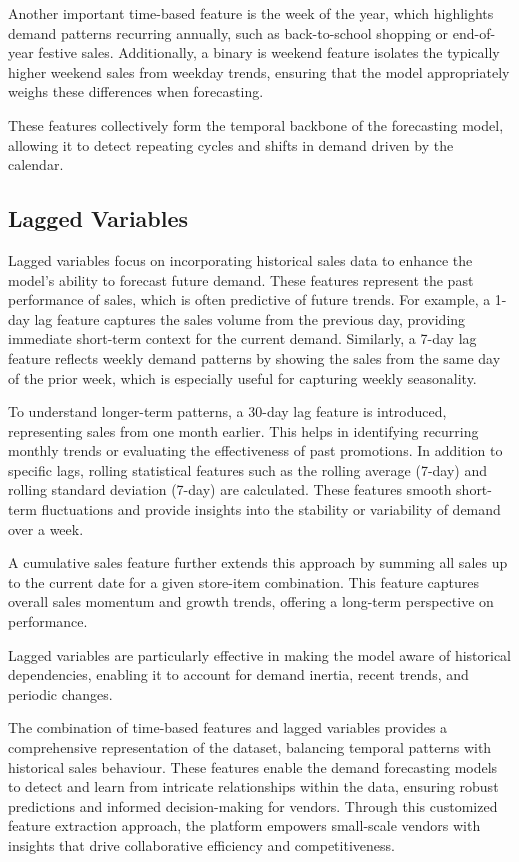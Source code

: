 Another important time-based feature is the week of the year, which highlights demand patterns recurring annually, such as back-to-school shopping or end-of-year festive sales. Additionally, a binary is weekend feature isolates the typically higher weekend sales from weekday trends, ensuring that the model appropriately weighs these differences when forecasting.

These features collectively form the temporal backbone of the forecasting model, allowing it to detect repeating cycles and shifts in demand driven by the calendar.

\subsection{Lagged Variables}

Lagged variables focus on incorporating historical sales data to enhance the model’s ability to forecast future demand. These features represent the past performance of sales, which is often predictive of future trends. For example, a 1-day lag feature captures the sales volume from the previous day, providing immediate short-term context for the current demand. Similarly, a 7-day lag feature reflects weekly demand patterns by showing the sales from the same day of the prior week, which is especially useful for capturing weekly seasonality.

To understand longer-term patterns, a 30-day lag feature is introduced, representing sales from one month earlier. This helps in identifying recurring monthly trends or evaluating the effectiveness of past promotions. In addition to specific lags, rolling statistical features such as the rolling average (7-day) and rolling standard deviation (7-day) are calculated. These features smooth short-term fluctuations and provide insights into the stability or variability of demand over a week.

A cumulative sales feature further extends this approach by summing all sales up to the current date for a given store-item combination. This feature captures overall sales momentum and growth trends, offering a long-term perspective on performance.

Lagged variables are particularly effective in making the model aware of historical dependencies, enabling it to account for demand inertia, recent trends, and periodic changes.


The combination of time-based features and lagged variables provides a comprehensive representation of the dataset, balancing temporal patterns with historical sales behaviour. These features enable the demand forecasting models to detect and learn from intricate relationships within the data, ensuring robust predictions and informed decision-making for vendors. Through this customized feature extraction approach, the platform empowers small-scale vendors with insights that drive collaborative efficiency and competitiveness.

